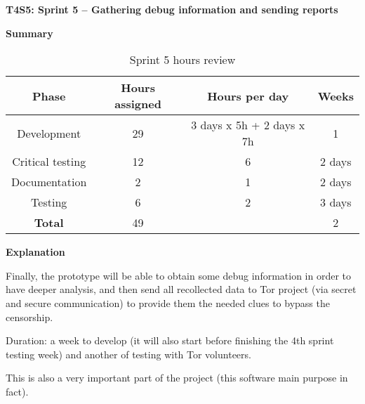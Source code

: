 \textbf{T4S5: Sprint 5 – Gathering debug information and sending reports}

\textbf{Summary}
\begin{table}[!htb]
\centering
  \begin{tabular}{| c | c | c | c |}
  \hline Phase & Hours assigned & Hours per day & Weeks \\ \hline  
  Development & 29 & 3 days x 5h + 2 days x 7h  & 1        \\ \hline
  Critical testing & 12 & 6 & 2 days       \\ \hline
  Documentation & 2 & 1 & 2 days        \\ \hline
  Testing & 6 & 2 & 3 days        \\ \hline \hline   
  \textbf{Total} & 49 &  & 2  \\ \hline
  \end{tabular}
  \caption{Sprint 5 hours review} \vspace{3pt}
  \label{tab:sprint5}
\end{table}

\textbf{Explanation}

Finally, the prototype will be able to obtain some debug information in order to have deeper analysis, and then send all recollected data to Tor project (via secret and secure communication) to provide them the needed clues to bypass the censorship.

Duration: a week to develop (it will also start before finishing the 4th sprint testing week) and another of testing with Tor volunteers.

This is also a very important part of the project (this software main purpose in fact).